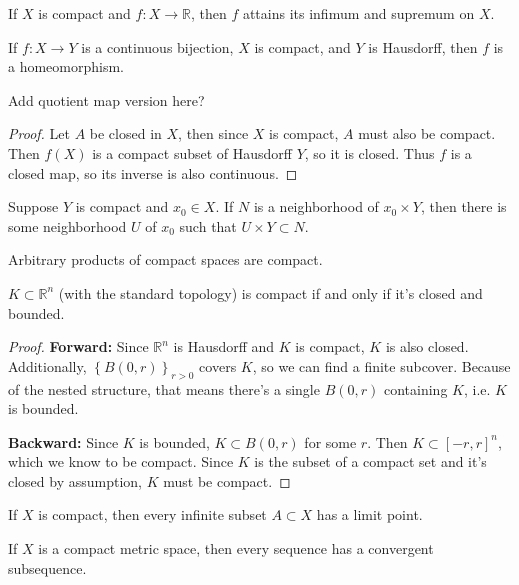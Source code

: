 \documentclass[twoside,10pt]{report}
\begin{document}
\begin{thrm}
If $X$ is compact and $f:X\to \mathbb{R}$, then $f$ attains its infimum and supremum on $X$.
\end{thrm}

\begin{cor}
	If $f:X\to Y$ is a continuous bijection, $X$ is compact, and $Y$ is Hausdorff, then $f$ is a homeomorphism.

	{\color{red}Add quotient map version here?}
\end{cor}
\begin{proof}
	Let $A$ be closed in $X$, then since $X$ is compact, $A$ must also be compact. Then $f(X)$ is a compact subset of Hausdorff $Y$, so it is closed. Thus $f$ is a closed map, so its inverse is also continuous.
\end{proof}

\begin{lem}
	Suppose $Y$ is compact and $x_0 \in X$. If $N$ is a neighborhood of $x_0 \times Y$, then there is some neighborhood $U$ of $x_0$ such that $U \times Y \subset N$.
\end{lem}

\begin{thrm}[Tychonoff]
Arbitrary products of compact spaces are compact.
\end{thrm}

\begin{thrm}
	$K \subset \mathbb{R}^{n}$ (with the standard topology) is compact if and only if it's closed and bounded.
\end{thrm}
\begin{proof}
	\textbf{Forward:} Since $\mathbb{R}^{n}$ is Hausdorff and $K$ is compact, $K$ is also closed. Additionally, $\left\{ B(0,r) \right\}_{r>0}$ covers $K$, so we can find a finite subcover. Because of the nested structure, that means there's a single $B(0,r)$ containing $K$, i.e. $K$ is bounded.

	\textbf{Backward:} Since $K$ is bounded, $K \subset B(0,r)$ for some $r$. Then $K \subset [-r,r]^{n}$, which we know to be compact. Since $K$ is the subset of a compact set and it's closed by assumption, $K$ must be compact.
\end{proof}

\begin{prop}
If $X$ is compact, then every infinite subset $A \subset X$ has a limit point.
\end{prop}

\begin{prop}[]
If $X$ is a compact metric space, then every sequence has a convergent subsequence.
\end{prop}
\end{document}
